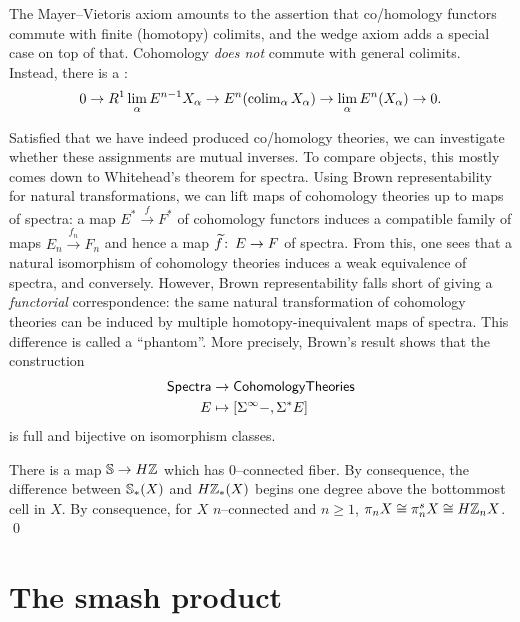 \begin{remark}
The Mayer--Vietoris axiom amounts to the assertion that co/homology functors commute with finite (homotopy) colimits, and the wedge axiom adds a special case on top of that.
Cohomology \emph{does not} commute with general colimits.%
Instead, there is a : \[0 \to R^1 \lim_\alpha E^{n-1} X_\alpha \to E^n(\colim_\alpha X_\alpha) \to \lim_\alpha E^n(X_\alpha) \to 0.\]
\end{remark}

Satisfied that we have indeed produced co/homology theories, we can investigate whether these assignments are mutual inverses.
To compare objects, this mostly comes down to Whitehead's theorem for spectra.
Using Brown representability for natural transformations, we can lift maps of cohomology theories up to maps of spectra: a map $E^* \xrightarrow f F^*$ of cohomology functors induces a compatible family of maps $E_n \xrightarrow{f_n} F_n$ and hence a map $\widetilde f\co E \to F$ of spectra.%
From this, one sees that a natural isomorphism of cohomology theories induces a weak equivalence of spectra, and conversely.
However, Brown representability falls short of giving a \emph{functorial} correspondence: the same natural transformation of cohomology theories can be induced by multiple homotopy-inequivalent maps of spectra.
This difference is called a ``phantom''.
More precisely, Brown's result shows that the construction
\begin{align*}
\CatOf{Spectra} & \to \CatOf{CohomologyTheories} \\
E & \mapsto [\Susp^\infty - , \Susp^* E]
\end{align*}
is full and bijective on isomorphism classes.

\begin{theorem}[Hurewicz]
There is a map $\S \to H\Z$ which has $0$--connected fiber.
By consequence, the difference between $\S_*(X)$ and $H\Z_*(X)$ begins one degree above the bottommost cell in $X$.
By consequence, for $X$ $n$--connected and $n \ge 1$, $\pi_n X \cong \pi_n^s X \cong H\Z_n X$. \qed
\end{theorem}




\section{The smash product}


